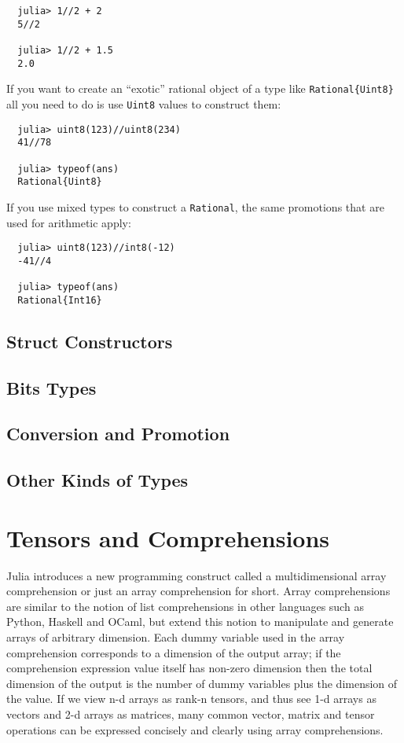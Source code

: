 \documentclass{article}
\renewcommand{\sec}[1]{\label{sec:#1}}
\begin{document}
\begin{verbatim}
  julia> 1//2 + 2
  5//2

  julia> 1//2 + 1.5
  2.0
\end{verbatim}
If you want to create an ``exotic'' rational object of a type like \verb|Rational{Uint8}| all you need to do is use \verb|Uint8| values to construct them:
\begin{verbatim}
  julia> uint8(123)//uint8(234)
  41//78

  julia> typeof(ans)
  Rational{Uint8}
\end{verbatim}
If you use mixed types to construct a \verb|Rational|, the same promotions that are used for arithmetic apply:
\begin{verbatim}
  julia> uint8(123)//int8(-12)
  -41//4

  julia> typeof(ans)
  Rational{Int16}
\end{verbatim}

\subsection{Struct Constructors}
\sec{struct-constructors}

\subsection{Bits Types}

\subsection{Conversion and Promotion}
\sec{conversion-and-promotion}

\subsection{Other Kinds of Types}

\section{Tensors and Comprehensions}

Julia introduces a new programming construct called a multidimensional
array comprehension or just an array comprehension for short. Array
comprehensions are similar to the notion of list comprehensions in
other languages such as Python, Haskell and OCaml, but extend this
notion to manipulate and generate arrays of arbitrary dimension. Each
dummy variable used in the array comprehension corresponds to a
dimension of the output array; if the comprehension expression value
itself has non-zero dimension then the total dimension of the output
is the number of dummy variables plus the dimension of the value. If
we view n-d arrays as rank-n tensors, and thus see 1-d arrays as
vectors and 2-d arrays as matrices, many common vector, matrix and
tensor operations can be expressed concisely and clearly using array
comprehensions.
\end{document}

